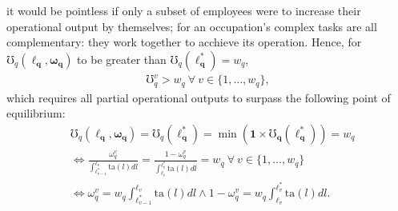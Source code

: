 \documentclass[hidelinks, nonatbib]{elsarticle}
\begin{document}
it would be pointless if only a subset of employees were to increase their operational output by themselves; for an occupation's complex tasks are all complementary: they work together to acchieve its operation. Hence, for $\mho_{q}(
    \boldsymbol{\ell_q}
    ,\boldsymbol{\omega_q}
)$ to be greater than $
\mho_{q}(
    \boldsymbol{\ell_{q}^{*}}
)
=
w_q$,
\begin{gather}
    \mho_{q}^{v} > w_q
    \
    \forall
    \
    v \in \{1, \dots, w_q\}
    ,
\end{gather}
which requires all partial operational outputs to surpass the following point of equilibrium:
\begin{align}
    &\mho_{q}(
        \boldsymbol{\ell_q}
        ,\boldsymbol{\omega_q}
    ) 
    =
    \mho_{q}(
        \boldsymbol{\ell_{q}^{*}}
    ) 
    = 
    \min(
        \boldsymbol{1}
        \times
        \boldsymbol{\mho_q}(
            \boldsymbol{\ell_{q}^{*}}
        )
    )
    =
    w_q
    \\
    &\iff
    \frac{
        \omega_{q}^{v}
    }{
        \int_{
            \ell_{v-1}^{*}
        }^{
            \ell_{v}
        }{
            \text{ta}(l)dl
        }
    }
    =
    \frac{
        1 - \omega_{q}^{v}
    }{
        \int_{
            \ell_{v}
        }^{
            \ell_{v}^{*}
        }{
            \text{ta}(l)dl
        }
    }
    =
    w_q
    \
    \forall
    \
    v \in \{1, \dots, w_q\}
    \\
    &\iff
    \omega_{q}^{v}
    =
    w_q
    \int_{
        \ell_{v-1}^{*}
    }^{
        \ell_{v}
    }{
        \text{ta}(l)
        dl
    }
    \land
    1 - \omega_{q}^{v}
    =
    w_q
    \int_{
        \ell_{v}
    }^{
        \ell_{v}^{*}
    }{
        \text{ta}(l)
        dl
    }
    .
\end{align}
\end{document}
